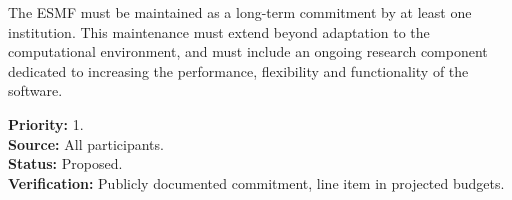 The ESMF must be maintained as a long-term commitment by at least one
institution.  This maintenance must extend beyond adaptation to the 
computational environment, and must include an ongoing research component
dedicated to increasing the performance, flexibility and functionality of
the software.
\begin{reqlist}
{\bf Priority:} 1. \\
{\bf Source:} All participants. \\
{\bf Status:} Proposed. \\
{\bf Verification:} Publicly documented commitment, line item in 
projected budgets.
\end{reqlist}






